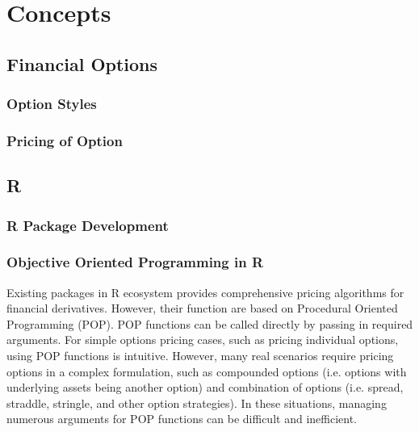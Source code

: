 \chapter{Concepts}

\section{Financial Options}

\subsection{Option Styles}

\subsection{Pricing of Option}

\section{R}

\subsection{R Package Development}


\subsection{Objective Oriented Programming in R}



Existing packages in R ecosystem provides comprehensive pricing algorithms for financial derivatives. However, their function are based on Procedural Oriented Programming (POP). POP functions can be called directly by passing in required arguments. For simple options pricing cases, such as pricing individual options, using POP functions is intuitive. However, many real scenarios require pricing options in a complex formulation, such as compounded options (i.e. options with underlying assets being another option) and combination of options (i.e. spread, straddle, stringle, and other option strategies). In these situations, managing numerous arguments for POP functions can be difficult and inefficient.

